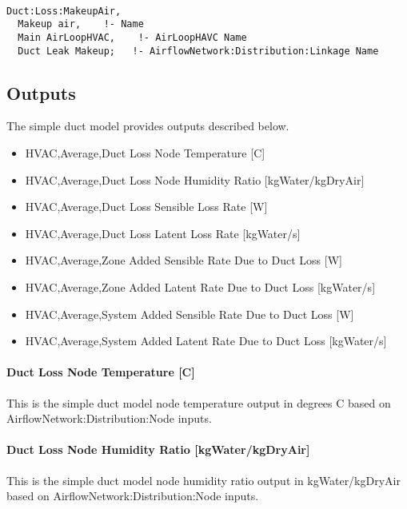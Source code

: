 \begin{lstlisting}

Duct:Loss:MakeupAir,
  Makeup air,    !- Name
  Main AirLoopHVAC,    !- AirLoopHAVC Name
  Duct Leak Makeup;   !- AirflowNetwork:Distribution:Linkage Name

\end{lstlisting}

\subsection{Outputs}\label{outputs-simple-duct-model}

The simple duct model provides outputs described below.

\begin{itemize}
\item
  HVAC,Average,Duct Loss Node Temperature {[}C{]}
\item
  HVAC,Average,Duct Loss Node Humidity Ratio {[}kgWater/kgDryAir{]}
\item
  HVAC,Average,Duct Loss Sensible Loss Rate {[}W{]}
\item
  HVAC,Average,Duct Loss Latent Loss Rate {[}kgWater/s{]}
\item
  HVAC,Average,Zone Added Sensible Rate Due to Duct Loss {[}W{]}
\item
  HVAC,Average,Zone Added Latent Rate Due to Duct Loss {[}kgWater/s{]}
\item
  HVAC,Average,System Added Sensible Rate Due to Duct Loss {[}W{]}
\item
  HVAC,Average,System Added Latent Rate Due to Duct Loss {[}kgWater/s{]}
\end{itemize}

\paragraph{Duct Loss Node Temperature {[}C{]}}\label{duct-loss--node-temperature-c}

This is the simple duct model node temperature output in degrees C based on AirflowNetwork:Distribution:Node inputs.

\paragraph{Duct Loss Node Humidity Ratio {[}kgWater/kgDryAir{]}}\label{roomairflownetwork-node-humidity-ratio-kgwaterkgdryair}

This is the simple duct model node humidity ratio output in kgWater/kgDryAir based on AirflowNetwork:Distribution:Node inputs.

